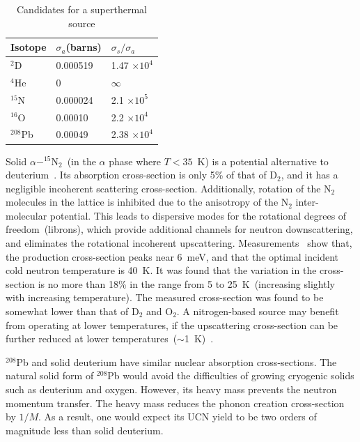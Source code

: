 \begin{table}
\begin{center}
\begin{tabular}{|l|l|l|}
\hline
Isotope & $\sigma_a$(barns) & $\sigma_s / \sigma_a$  \\
\hline
$^2$D & 0.000519 & 1.47 $\times 10^4$ \\
\hline
$^4$He & 0 & $\infty$ \\
\hline
$^{15}$N & 0.000024 & 2.1 $\times 10^5$ \\
\hline
$^{16}$O & 0.00010 & 2.2 $\times 10^4$ \\
\hline
$^{208}$Pb & 0.00049 &  2.38 $\times 10^4$\\
\hline
\end{tabular}
\end{center}
\caption{Candidates for a superthermal source\label{tab:other_sources}}
\end{table}

Solid $\alpha - ^{15}$N$_2$~(in the $\alpha$ phase where $T < 35$~K)
is a potential alternative to deuterium~\cite{Salvat2013}. Its
absorption cross-section is only 5\% of that of D$_2$, and it has a
negligible incoherent scattering cross-section. Additionally, rotation
of the N$_2$ molecules in the lattice is inhibited due to the
anisotropy of the N$_2$ inter-molecular potential. This leads to
dispersive modes for the rotational degrees of freedom~(librons),
which provide additional channels for neutron downscattering, and
eliminates the rotational incoherent
upscattering. Measurements~\cite{Salvat2013} show that, the production
cross-section peaks near 6~meV, and that the optimal incident cold
neutron temperature is 40~K. It was found that the variation in the
cross-section is no more than 18\% in the range from 5 to
25~K~(increasing slightly with increasing temperature). The measured
cross-section was found to be somewhat lower than that of D$_2$ and
O$_2$.
A nitrogen-based source may benefit from operating at lower
temperatures, if the upscattering cross-section can be further reduced
at lower temperatures~($\sim$1~K)~\cite{Salvat2013}.


$^{208}$Pb and solid deuterium have similar nuclear absorption
cross-sections. The natural solid form of $^{208}$Pb would avoid the
difficulties of growing cryogenic solids such as deuterium and
oxygen. However, its heavy mass prevents the neutron momentum
transfer. The heavy mass reduces the phonon creation cross-section by
$1/M$. As a result, one would expect its UCN yield to be two orders of
magnitude less than solid deuterium.

